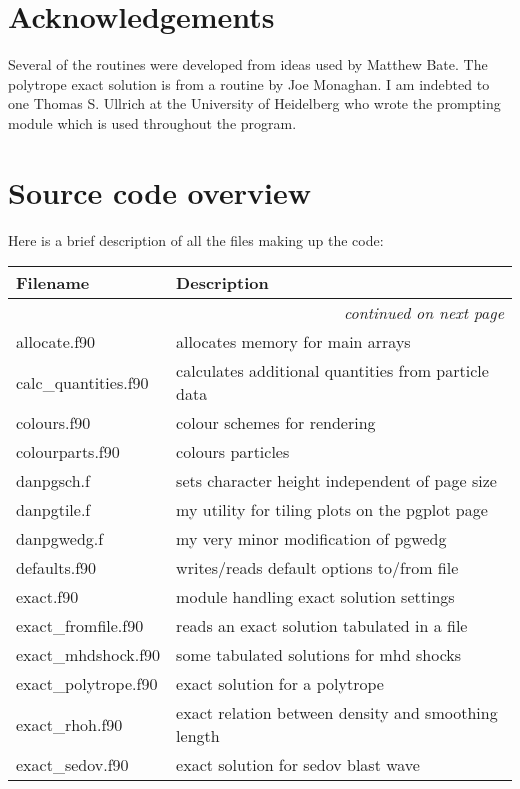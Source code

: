 \documentclass[a4paper,12pt]{article}
\begin{document}
\section*{Acknowledgements}
 Several of the routines were developed from ideas used by Matthew Bate. The
polytrope exact solution is from a routine by Joe Monaghan. I am indebted to one
Thomas S. Ullrich at the University of Heidelberg who wrote the prompting module
which is used throughout the program.

\newpage
\appendix

\section{Source code overview}
Here is a brief description of all the files making up the code:
\begin{longtable}{|lp{}|}
\hline
Filename & Description \\
\hline \endhead
\multicolumn{2}{|r|}{\emph{continued on next page}} \\
\hline \endfoot
\hline \endlastfoot
     allocate.f90           & allocates memory for main arrays \\
     calc\_quantities.f90    & calculates additional quantities from particle data \\
     colours.f90            & colour schemes for rendering\\
     colourparts.f90	 & colours particles\\
     danpgsch.f           & sets character height independent of page size\\
     danpgtile.f          & my utility for tiling plots on the pgplot page\\
     danpgwedg.f          & my very minor modification of pgwedg\\
     defaults.f90           & writes/reads default options to/from file\\
     exact.f90              & module handling exact solution settings\\
     exact\_fromfile.f90     & reads an exact solution tabulated in a file\\
     exact\_mhdshock.f90     & some tabulated solutions for mhd shocks\\ 
     exact\_polytrope.f90    & exact solution for a polytrope\\
     exact\_rhoh.f90	 & exact relation between density and smoothing length\\
     exact\_sedov.f90        & exact solution for sedov blast wave\\

\end{longtable}
\end{document}
